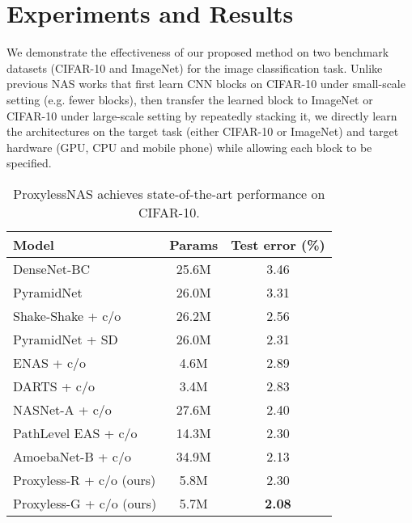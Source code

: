 \documentclass{article} \usepackage{iclr2019_conference,times}
\begin{document}
\section{Experiments and Results}
We demonstrate the effectiveness of our proposed method on two benchmark datasets (CIFAR-10 and ImageNet) for the image classification task. Unlike previous NAS works \citep{zoph2017learning,liu2018darts} that first learn CNN blocks on CIFAR-10 under small-scale setting (e.g. fewer blocks), then transfer the learned block to ImageNet or CIFAR-10 under large-scale setting by repeatedly stacking it, we directly learn the architectures on the target task (either CIFAR-10 or ImageNet) and target hardware (GPU, CPU and mobile phone) while allowing each block to be specified. 

\begin{table}[t]
    \vspace{-10pt}
    \centering
    \begin{tabular}{l | c | c }
    	\hline
    	Model & Params & Test error (\%) \\
    	\hline
    	DenseNet-BC \citep{huang2017densely} & 25.6M & 3.46 \\ 
    	PyramidNet \citep{han2017deep} & 26.0M & 3.31 \\
    	Shake-Shake + c/o \citep{devries2017improved} & 26.2M & 2.56 \\
    	PyramidNet + SD \citep{yamada2018shakedrop} & 26.0M & 2.31 \\
    	\hline
    	ENAS + c/o \citep{pham2018efficient} & 4.6M & 2.89 \\
    	DARTS + c/o \citep{liu2018darts} & 3.4M & 2.83 \\
    	NASNet-A + c/o \citep{zoph2017learning} & 27.6M & 2.40 \\
    	PathLevel EAS + c/o \citep{cai2018path} & 14.3M & 2.30 \\
    	AmoebaNet-B + c/o \citep{real2018regularized} & 34.9M & 2.13 \\
    	\hline
    	Proxyless-R + c/o (ours) & 5.8M & 2.30 \\ 
    	Proxyless-G + c/o (ours) & 5.7M & \textbf{2.08} \\
    	\hline
    \end{tabular}
    \caption{ ProxylessNAS achieves state-of-the-art performance on CIFAR-10.}\label{tab:cifar_main}
\end{table}
\end{document}
